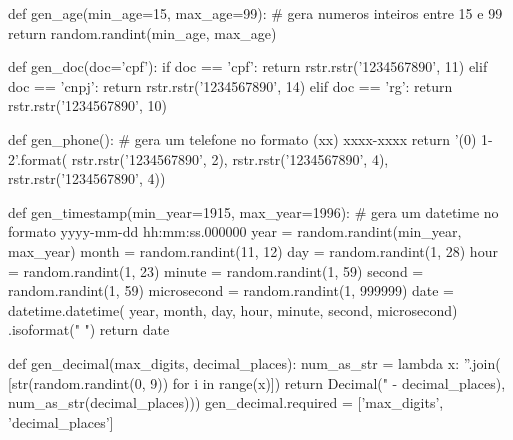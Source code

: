 \documentclass[aspectratio=169]{beamer}
\begin{document}
{\begin{frame}[fragile]
\begin{pythoncode}
def gen_age(min_age=15, max_age=99):
    # gera numeros inteiros entre 15 e 99
    return random.randint(min_age, max_age)
\end{pythoncode}

\end{frame}

\begin{frame}[fragile]

\begin{pythoncode}
def gen_doc(doc='cpf'):
    if doc == 'cpf':
        return rstr.rstr('1234567890', 11)
    elif doc == 'cnpj':
        return rstr.rstr('1234567890', 14)
    elif doc == 'rg':
        return rstr.rstr('1234567890', 10)
\end{pythoncode}	

\end{frame}

\begin{frame}[fragile]
	
\begin{pythoncode}
def gen_phone():
    # gera um telefone no formato (xx) xxxx-xxxx
    return '({0}) {1}-{2}'.format(
        rstr.rstr('1234567890', 2),
        rstr.rstr('1234567890', 4),
        rstr.rstr('1234567890', 4))
\end{pythoncode}

\end{frame}

\begin{frame}[fragile]

\begin{pythoncode}
def gen_timestamp(min_year=1915, max_year=1996):
    # gera um datetime no formato yyyy-mm-dd hh:mm:ss.000000
    year = random.randint(min_year, max_year)
    month = random.randint(11, 12)
    day = random.randint(1, 28)
    hour = random.randint(1, 23)
    minute = random.randint(1, 59)
    second = random.randint(1, 59)
    microsecond = random.randint(1, 999999)
    date = datetime.datetime(
        year, month, day, hour, minute, second, microsecond)
        .isoformat(" ")
    return date
\end{pythoncode}

\end{frame}


\begin{frame}[fragile]
	
\begin{pythoncode}
def gen_decimal(max_digits, decimal_places):
    num_as_str = lambda x: ''.join(
        [str(random.randint(0, 9)) for i in range(x)])
    return Decimal("%
                              - decimal_places),
                              num_as_str(decimal_places)))
gen_decimal.required = ['max_digits', 'decimal_places']
\end{pythoncode}


\end{frame}}
\end{document}
